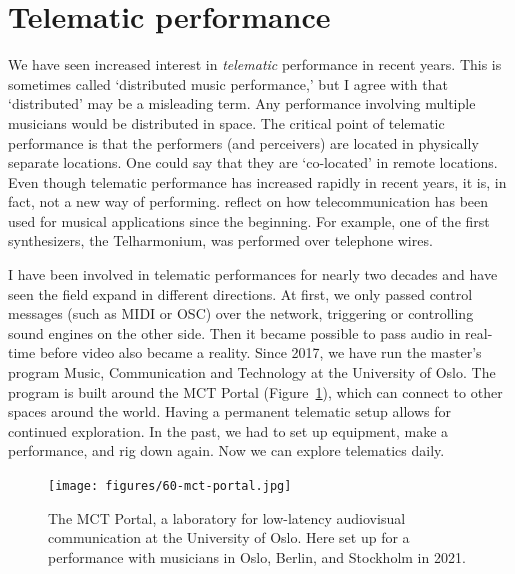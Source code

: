 \section{Telematic performance}\label{sec:telematic}

We have seen increased interest in \emph{telematic} performance in recent years.
This is sometimes called `distributed music performance,' but I agree with \citet[p.423--424]{braasch_telematic_2009} that `distributed' may be a misleading term. Any performance involving multiple musicians would be distributed in space. The critical point of telematic performance is that the performers (and perceivers) are located in physically separate locations. One could say that they are `co-located' in remote locations. Even though telematic performance has increased rapidly in recent years, it is, in fact, not a new way of performing. \citet{holmes_electronic_2012} reflect on how telecommunication has been used for musical applications since the beginning. For example, one of the first synthesizers, the Telharmonium, was performed over telephone wires.

I have been involved in telematic performances for nearly two decades and have seen the field expand in different directions. At first, we only passed control messages (such as MIDI or OSC) over the network, triggering or controlling sound engines on the other side. Then it became possible to pass audio in real-time before video also became a reality. Since 2017, we have run the master's program Music, Communication and Technology at the University of Oslo. The program is built around the MCT Portal (Figure~\ref{fig:portal}), which can connect to other spaces around the world. Having a permanent telematic setup allows for continued exploration. In the past, we had to set up equipment, make a performance, and rig down again. Now we can explore telematics daily.

\begin{figure}[tp]
	\texttt{[image: figures/60-mct-portal.jpg]}
	\caption{The MCT Portal, a laboratory for low-latency audiovisual communication at the University of Oslo. Here set up for a performance with musicians in Oslo, Berlin, and Stockholm in 2021.}
	\label{fig:portal}
\end{figure}


